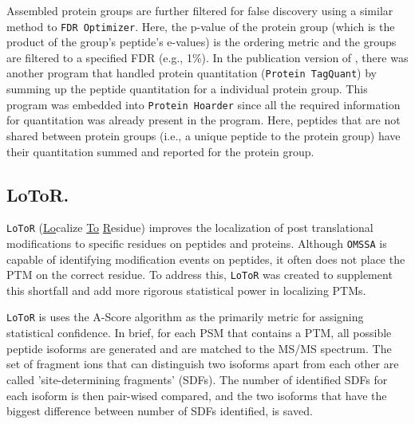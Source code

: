 Assembled protein groups are further filtered for false discovery using a similar method to \texttt{FDR Optimizer}. Here, the p-value of the protein group (which is the product of the group's peptide's e-values) is the ordering metric and the groups are filtered to a specified FDR (e.g., 1\%). In the publication version of \compass{}, there was another program that handled protein quantitation (\texttt{Protein TagQuant}) by summing up the peptide quantitation for a individual protein group. This program was embedded into \texttt{Protein Hoarder} since all the required information for quantitation was already present in the program. Here, peptides that are not shared between protein groups (i.e., a unique peptide to the protein group) have their quantitation summed and reported for the protein group.

\subsection*{LoToR.}
\texttt{LoToR} (\underline{Lo}calize \underline{To} \underline{R}esidue) improves the localization of post translational modifications to specific residues on peptides and proteins. Although \texttt{OMSSA} is capable of identifying modification events on peptides, it often does not place the PTM on the correct residue. To address this, \texttt{LoToR} was created to supplement this shortfall and add more rigorous statistical power in localizing PTMs. 

\texttt{LoToR} is uses the A-Score algorithm as the primarily metric for assigning statistical confidence.\cite{ascore} In brief, for each PSM that contains a PTM, all possible peptide isoforms are generated and are matched to the MS/MS spectrum. The set of fragment ions that can distinguish two isoforms apart from each other are called 'site-determining fragments' (SDFs). The number of identified SDFs for each isoform is then pair-wised compared, and the two isoforms that have the biggest difference between number of SDFs identified, is saved.

